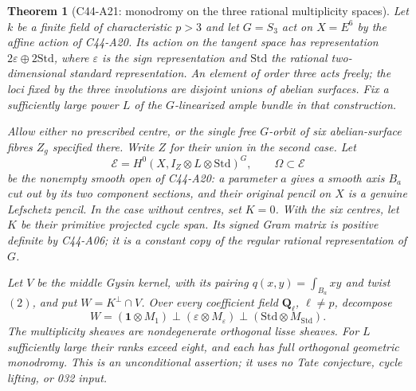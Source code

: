 \documentclass[11pt]{article}
\newtheorem{theorem}{Theorem}[section]
\theoremstyle{remark}\newtheorem{remark}[theorem]{Remark}
\begin{document}
\begin{theorem}[C44-A21: monodromy on the three rational multiplicity spaces]
Let $k$ be a finite field of characteristic $p>3$ and let $G=S_3$ act on
$X=E^6$ by the affine action of C44-A20.  Its action on the tangent space has
representation $2\varepsilon\oplus2\mathrm{Std}$, where $\varepsilon$ is the
sign representation and $\mathrm{Std}$ the rational two-dimensional standard
representation.  An element of order three acts freely; the loci fixed by the
three involutions are disjoint unions of abelian surfaces.  Fix a sufficiently
large power $L$ of the $G$-linearized ample bundle in that construction.

Allow either no prescribed centre, or the single free $G$-orbit of six
abelian-surface fibres $Z_g$ specified there.  Write $Z$ for their union in
the second case.  Let
\[
 \mathcal E=H^0(X,I_Z\otimes L\otimes\mathrm{Std})^G,
 \qquad
 \Omega\subset\mathcal E                                       \tag{A21.1}
\]
be the nonempty smooth open of C44-A20: a parameter $a$ gives a smooth axis
$B_a$ cut out by its two component sections, and their original pencil on
$X$ is a genuine Lefschetz pencil.  In the case without centres, set $K=0$.
With the six centres, let $K$ be their primitive projected cycle span.  Its
signed Gram matrix is positive definite by C44-A06; it is a constant copy
of the regular rational representation of $G$.

Let $V$ be the middle Gysin kernel, with its pairing $q(x,y)=\int_{B_a}xy$
and twist $(2)$, and put $W=K^\perp\cap V$.  Over every coefficient field
$\mathbf Q_\ell$, $\ell\ne p$, decompose
\[
 W=(\mathbf1\otimes M_1)\perp(\varepsilon\otimes M_\varepsilon)
                      \perp(\mathrm{Std}\otimes M_{\mathrm{Std}}).
                                                                  \tag{A21.2}
\]
The multiplicity sheaves are nondegenerate orthogonal lisse sheaves.
For $L$ sufficiently large their ranks exceed eight, and each has full
orthogonal geometric monodromy.  This is an unconditional assertion; it
uses no Tate conjecture, cycle lifting, or 032 input.
\end{theorem}
\end{document}
